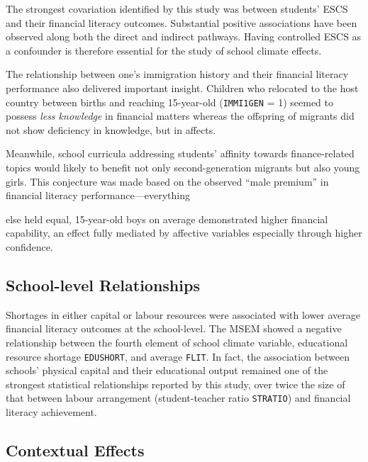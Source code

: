 \documentclass[a4paper,11pt,UKenglish,twoside,openright]{report}\usepackage[]{graphicx}\usepackage[]{color}
\begin{document}
The strongest covariation identified by this study was between students' ESCS and their financial literacy outcomes. Substantial positive associations have been observed along both the direct and indirect pathways. Having controlled ESCS as a confounder is therefore essential for the study of school climate effects.

The relationship between one's immigration history and their financial literacy performance also delivered important insight. Children who relocated to the host country between births and reaching 15-year-old (\texttt{IMMI1GEN} = 1) seemed to possess \emph{less knowledge} in financial matters whereas the offspring of migrants did not show deficiency in knowledge, but in affects.

Meanwhile, school curricula addressing students' affinity towards finance-related topics would likely to benefit not only second-generation migrants but also young girls. This conjecture was made based on the observed ``male premium'' in financial literacy performance---everything





\noindent else held equal, 15-year-old boys on average demonstrated higher financial capability, an effect fully mediated by affective variables especially through higher confidence.



\subsection{School-level Relationships}

Shortages in either capital or labour resources were associated with lower average financial literacy outcomes at the school-level. The MSEM showed a negative relationship between the fourth element of school climate variable, educational resource shortage \texttt{EDUSHORT}, and average \texttt{FLIT}. In fact, the association between schools' physical capital and their educational output remained one of the strongest statistical relationships reported by this study, over twice the size of that between labour arrangement (student-teacher ratio \texttt{STRATIO}) and financial literacy achievement.

\subsection{Contextual Effects}
\end{document}
